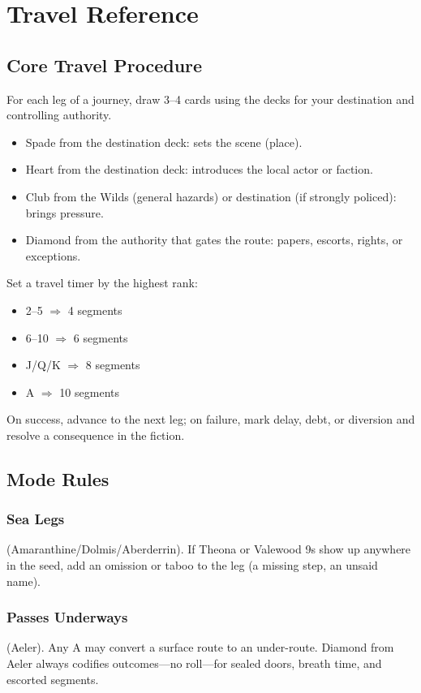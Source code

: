 \documentclass[11pt,letterpaper,twoside]{book}
\begin{document}
\chapter{Travel Reference}

\section{Core Travel Procedure}

For each leg of a journey, draw 3--4 cards using the decks for your destination and controlling authority.

\begin{itemize}
\item Spade from the destination deck: sets the scene (place).
\item Heart from the destination deck: introduces the local actor or faction.
\item Club from the Wilds (general hazards) or destination (if strongly policed): brings pressure.
\item Diamond from the authority that gates the route: papers, escorts, rights, or exceptions.
\end{itemize}

Set a travel timer by the highest rank:
\begin{itemize}
\item 2--5 $\Rightarrow$ 4 segments
\item 6--10 $\Rightarrow$ 6 segments
\item J/Q/K $\Rightarrow$ 8 segments
\item A $\Rightarrow$ 10 segments
\end{itemize}

On success, advance to the next leg; on failure, mark delay, debt, or diversion and resolve a consequence in the fiction.

\section{Mode Rules}

\subsection{Sea Legs}
(Amaranthine/Dolmis/Aberderrin). If Theona or Valewood 9s show up anywhere in the seed, add an omission or taboo to the leg (a missing step, an unsaid name).

\subsection{Passes Underways}
(Aeler). Any A may convert a surface route to an under-route. Diamond from Aeler always codifies outcomes---no roll---for sealed doors, breath time, and escorted segments.
\end{document}
